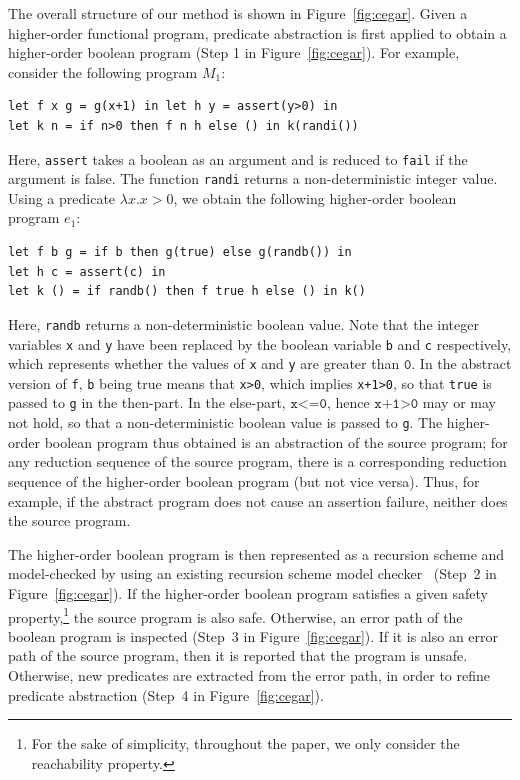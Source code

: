 The overall structure of our method is shown in Figure~\ref{fig:cegar}. 
Given a higher-order functional program, predicate abstraction is first 
applied to obtain a higher-order boolean program (Step 1 in 
Figure~\ref{fig:cegar}). For example, consider the following program 
\(M_1\):
\begin{verbatim}
let f x g = g(x+1) in let h y = assert(y>0) in
let k n = if n>0 then f n h else () in k(randi())
\end{verbatim}
Here, \texttt{assert} takes a boolean as an argument and is reduced to 
\texttt{fail} if the argument is false. The function \texttt{randi} 
returns a non-deterministic integer value. Using a predicate \(\lambda 
x.x>0\), we obtain the following higher-order boolean program \(e_1\):
\begin{verbatim}
let f b g = if b then g(true) else g(randb()) in
let h c = assert(c) in
let k () = if randb() then f true h else () in k()
\end{verbatim}
Here, \texttt{randb} returns a non-deterministic boolean value. Note 
that the integer variables \verb|x| and \verb|y| have been replaced by 
the boolean variable \texttt{b} and \texttt{c} respectively, which 
represents whether the values of \texttt{x} and \texttt{y} are greater 
than \(\texttt{0}\). In the abstract version of \texttt{f}, \texttt{b} 
being true means that \texttt{x>0}, which implies \texttt{x+1>0}, so 
that \texttt{true} is passed to \texttt{g} in the then-part. In the 
else-part, \(\texttt{x<=0}\), hence \(\texttt{x+1>0}\) may or may not 
hold, so that a non-deterministic boolean value is passed to \texttt{g}. 
The higher-order boolean program thus obtained is an abstraction of the 
source program; for any reduction sequence of the source program, there 
is a corresponding reduction sequence of the higher-order boolean 
program (but not vice versa). Thus, for example, if the abstract program 
does not cause an assertion failure, neither does the source program.

The higher-order boolean program is then represented as a recursion 
scheme and model-checked by using an existing recursion scheme model 
checker~\cite{Kobayashi2009,Kobayashi2009d} (Step~2 in 
Figure~\ref{fig:cegar}). 
%
If the higher-order boolean program satisfies a given safety 
property,\footnote{For the sake of simplicity, throughout the paper, we 
only consider the reachability property.} the source program is also 
safe. Otherwise, an error path of the boolean program is inspected 
(Step~3 in Figure~\ref{fig:cegar}). If it is also an error path of the 
source program, then it is reported that the program is unsafe. 
Otherwise, new predicates are extracted from the error path, in order to 
refine predicate abstraction (Step~4 in Figure~\ref{fig:cegar}).

